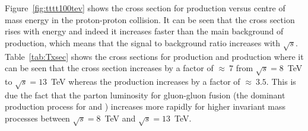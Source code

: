 Figure~\ref{fig:tttt100tev} shows the cross section for \tttt production versus centre of mass energy in the proton-proton collision. It can be seen that the cross section rises with energy and indeed it increases faster than the main background of \ttbar production, which means that the signal to background ratio increases with $\sqrt{s}$. Table~\ref{tab:Txsec} shows the cross sections for \tttt production and \ttbar production where it can be seen that the \tttt cross section increases by a factor of $\approx~7$ from $\sqrt{s} = 8$~TeV to $\sqrt{s} = 13$~TeV whereas the \ttbar production increases by a factor of $\approx~3.5$. This is due the fact that the parton luminosity for gluon-gluon fusion (the dominant production process for \ttbar and \tttt) increases more rapidly for higher invariant mass processes between $\sqrt{s} = 8$~TeV and $\sqrt{s} = 13$~TeV.


